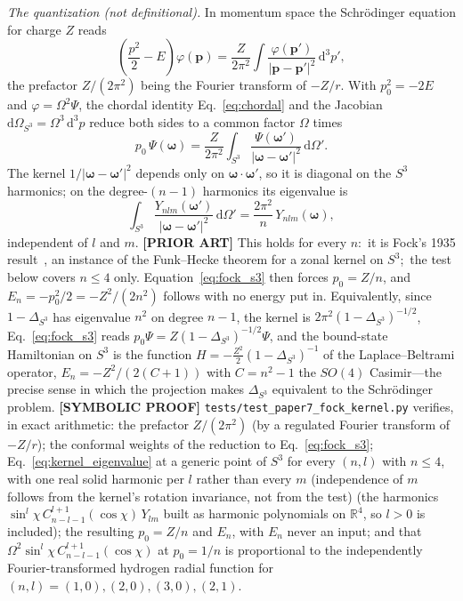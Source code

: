 \documentclass[aps,pra,twocolumn,superscriptaddress,longbibliography]{revtex4-2}
\begin{document}
\textit{The quantization (not definitional).} In momentum space the Schr\"odinger equation for charge $Z$ reads
\begin{equation}
\left(\frac{p^2}{2} - E\right)\varphi(\mathbf{p}) = \frac{Z}{2\pi^2}\int \frac{\varphi(\mathbf{p}')}{|\mathbf{p}-\mathbf{p}'|^2}\,\mathrm{d}^3p',
\label{eq:fock_integral}
\end{equation}
the prefactor $Z/(2\pi^2)$ being the Fourier transform of $-Z/r$. With $p_0^2 = -2E$ and $\varphi = \Omega^2\Psi$, the chordal identity Eq.~\eqref{eq:chordal} and the Jacobian $\mathrm{d}\Omega_{S^3} = \Omega^3\,\mathrm{d}^3p$ reduce both sides to a common factor $\Omega$ times
\begin{equation}
p_0\,\Psi(\boldsymbol{\omega}) = \frac{Z}{2\pi^2}\int_{S^3}\frac{\Psi(\boldsymbol{\omega}')}{|\boldsymbol{\omega}-\boldsymbol{\omega}'|^2}\,\mathrm{d}\Omega' .
\label{eq:fock_s3}
\end{equation}
The kernel $1/|\boldsymbol{\omega}-\boldsymbol{\omega}'|^2$ depends only on $\boldsymbol{\omega}\cdot\boldsymbol{\omega}'$, so it is diagonal on the $S^3$ harmonics; on the degree-$(n-1)$ harmonics its eigenvalue is
\begin{equation}
\int_{S^3}\frac{Y_{nlm}(\boldsymbol{\omega}')}{|\boldsymbol{\omega}-\boldsymbol{\omega}'|^2}\,\mathrm{d}\Omega' = \frac{2\pi^2}{n}\,Y_{nlm}(\boldsymbol{\omega}),
\label{eq:kernel_eigenvalue}
\end{equation}
independent of $l$ and $m$. \textbf{[PRIOR ART]} This holds for every $n$:\ it is Fock's 1935 result~\cite{fock1935}, an instance of the Funk--Hecke theorem for a zonal kernel on $S^3$;\ the test below covers $n \le 4$ only. Equation~\eqref{eq:fock_s3} then forces $p_0 = Z/n$, and $E_n = -p_0^2/2 = -Z^2/(2n^2)$ follows with no energy put in. Equivalently, since $1-\Delta_{S^3}$ has eigenvalue $n^2$ on degree $n-1$, the kernel is $2\pi^2(1-\Delta_{S^3})^{-1/2}$, Eq.~\eqref{eq:fock_s3} reads $p_0\Psi = Z(1-\Delta_{S^3})^{-1/2}\Psi$, and the bound-state Hamiltonian on $S^3$ is the function $H = -\tfrac{Z^2}{2}(1-\Delta_{S^3})^{-1}$ of the Laplace--Beltrami operator, $E_n = -Z^2/(2(C+1))$ with $C = n^2-1$ the $SO(4)$ Casimir---the precise sense in which the projection makes $\Delta_{S^3}$ equivalent to the Schr\"odinger problem. \textbf{[SYMBOLIC PROOF]} \texttt{tests/test\_paper7\_fock\_kernel.py} verifies, in exact arithmetic: the prefactor $Z/(2\pi^2)$ (by a regulated Fourier transform of $-Z/r$); the conformal weights of the reduction to Eq.~\eqref{eq:fock_s3}; Eq.~\eqref{eq:kernel_eigenvalue} at a generic point of $S^3$ for every $(n, l)$ with $n \le 4$, with one real solid harmonic per $l$ rather than every $m$ (independence of $m$ follows from the kernel's rotation invariance, not from the test) (the harmonics $\sin^l\!\chi\, C^{l+1}_{n-l-1}(\cos\chi)\,Y_{lm}$ built as harmonic polynomials on $\mathbb{R}^4$, so $l > 0$ is included); the resulting $p_0 = Z/n$ and $E_n$, with $E_n$ never an input; and that $\Omega^2\sin^l\!\chi\, C^{l+1}_{n-l-1}(\cos\chi)$ at $p_0 = 1/n$ is proportional to the independently Fourier-transformed hydrogen radial function for $(n,l) = (1,0), (2,0), (3,0), (2,1)$.
\end{document}
